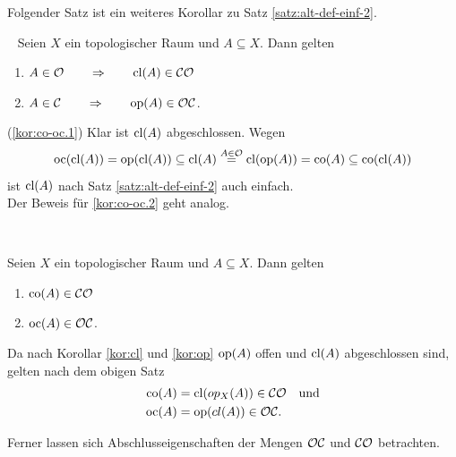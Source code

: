 %        
    Folgender Satz ist ein weiteres Korollar zu Satz \ref{satz:alt-def-einf-2}.
%    
    \begin{kor} \label{kor:co-oc} \ \vspace{8pt}
        \noindent
        Seien $X$ ein topologischer Raum und $A \subseteq X$. Dann gelten
        \begin{enumerate}
            \item \label{kor:co-oc.1} $A \in \mathcal{O} \quad \quad \Rightarrow \quad \quad \text{cl}(A) \in \mathcal{CO}$
            \item \label{kor:co-oc.2} $A \in \mathcal{C} \quad \quad \Rightarrow \quad \quad \text{op}(A) \in \mathcal{OC}$.
        \end{enumerate}
    \end{kor}
    \begin{bew}
        (\ref{kor:co-oc.1}) Klar ist $\text{cl}(A)$ abgeschlossen. Wegen
        $$\text{oc}(\text{cl}(A)) = \text{op}(\text{cl}(A)) \subseteq \text{cl}(A) 
        \overset{A \in \mathcal{O}}{=} \text{cl}(\text{op}(A)) = \text{co}(A) \subseteq \text{co}(\text{cl}(A)) $$
        ist $\text{cl}(A)$ nach Satz \ref{satz:alt-def-einf-2} auch einfach.\\
        Der Beweis für \ref{kor:co-oc.2} geht analog.
    \end{bew}
%
    \begin{kor} \label{kor:co-CO-oc-OC} \ \vspace{8pt}

        \noindent
        Seien $X$ ein topologischer Raum und $A \subseteq X$. Dann gelten
        \begin{enumerate}
            \item \label{kor:co-CO-oc-OC.1} $\text{co}(A) \in \mathcal{CO}$
            \item \label{kor:co-CO-oc-OC.2} $\text{oc}(A) \in \mathcal{OC}$.
        \end{enumerate}
    \end{kor}
%
    \begin{bew}
    Da nach Korollar \ref{kor:cl} und \ref{kor:op} $\text{op}(A)$ offen und $\text{cl}(A)$ abgeschlossen sind, gelten nach dem obigen Satz
        \begin{align*}
            \text{co}(A) &= \text{cl}(op_X(A)) \in \mathcal{CO} \quad \text{und}\\
            \text{oc}(A) &= \text{op}(cl(A)) \in \mathcal{OC}.
        \end{align*}
    \end{bew}
%    
%    
    Ferner
    lassen sich Abschlusseigenschaften der Mengen $\mathcal{OC}$ und $\mathcal{CO}$ betrachten.
